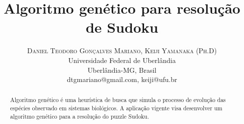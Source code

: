 \documentclass[twoside]{article}
\title{\vspace{-15mm}\fontsize{24pt}{10pt}\selectfont\textbf{Algoritmo genético para resolução de Sudoku}} %
\author{
\large
\textsc{Daniel Teodoro Gonçalves Mariano, Keiji Yamanaka (Ph.D)}\\[2mm] %
\normalsize Universidade Federal de Uberlândia\\ \normalsize Uberlândia-MG, Brasil \\ %
\normalsize {dtgmariano@gmail.com, keiji@ufu.br} %
\vspace{-5mm}
}
\date{}
\begin{document}
\maketitle %

\thispagestyle{fancy} %



\begin{abstract}
\noindent
Algoritmo genético é uma heurística de busca que simula o processo de evolução das espécies observado em sistemas biológicos. A aplicação vigente visa desenvolver um algoritmo genético para a resolução do puzzle Sudoku.
\end{abstract}

\end{document}
